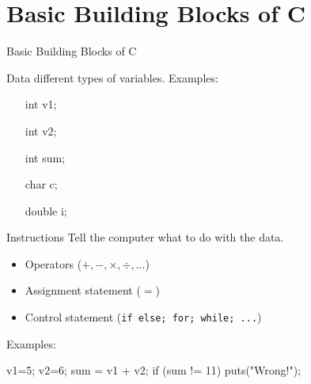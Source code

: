 \mode*
\section{Basic Building Blocks of C}

\begin{frame}[fragile]{Basic Building Blocks of C}
  \begin{block}{Data}
    different \alert{types} of \alert{variables}. Examples:\ttfamily
    \begin{multicols}{3}
      \begin{itemize}
      \item[int] v1;
      \item[int] v2;
      \item[int] sum;
      \item[char] c;
      \item[double] i;
      \end{itemize}
    \end{multicols}
  \end{block}
  \begin{block}{Instructions}
    Tell the computer what to do with the data.
    \begin{multicols}{2}
      \begin{itemize}
      \item Operators ($+, -, \times{}, \div{}, ...$)
      \item Assignment statement ($=$)
      \item Control statement (\texttt{if else; for; while; ...})
      \end{itemize}
    \end{multicols}
  \end{block}
  Examples:
  \begin{center}
\begin{ccode}
v1=5; v2=6;
sum = v1 + v2;
if (sum != 11) puts("Wrong!");
\end{ccode}    
  \end{center}
\end{frame}

